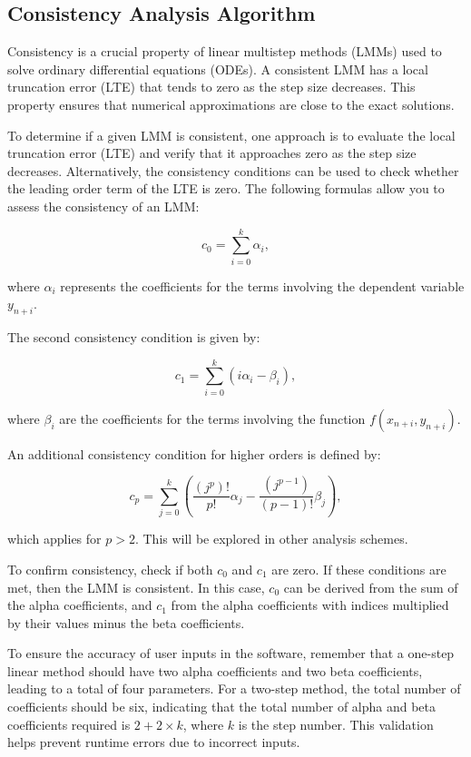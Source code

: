 \subsection{Consistency Analysis Algorithm}

Consistency is a crucial property of linear multistep methods (LMMs) used to solve ordinary differential equations (ODEs). A consistent LMM has a local truncation error (LTE) that tends to zero as the step size decreases. This property ensures that numerical approximations are close to the exact solutions.

To determine if a given LMM is consistent, one approach is to evaluate the local truncation error (LTE) and verify that it approaches zero as the step size decreases. Alternatively, the consistency conditions can be used to check whether the leading order term of the LTE is zero. The following formulas allow you to assess the consistency of an LMM:

\begin{equation}
   c_0 = \sum_{i=0}^{k} \alpha_{i},
\end{equation}

where \(\alpha_{i}\) represents the coefficients for the terms involving the dependent variable \(y_{n+i}\).

The second consistency condition is given by:

\begin{equation}
   c_1 = \sum_{i=0}^{k} (i \alpha_{i} - \beta_{i}),
\end{equation}

where \(\beta_{i}\) are the coefficients for the terms involving the function \(f(x_{n+i}, y_{n+i})\).

An additional consistency condition for higher orders is defined by:

\begin{equation}
   c_p = \sum_{j=0}^{k} \left( \frac{(j^p)!}{p!} \alpha_j - \frac{(j^{p-1})}{(p-1)!} \beta_j \right),
\end{equation}

which applies for \(p > 2\). This will be explored in other analysis schemes.

To confirm consistency, check if both \(c_0\) and \(c_1\) are zero. If these conditions are met, then the LMM is consistent. In this case, \(c_0\) can be derived from the sum of the alpha coefficients, and \(c_1\) from the alpha coefficients with indices multiplied by their values minus the beta coefficients.

To ensure the accuracy of user inputs in the software, remember that a one-step linear method should have two alpha coefficients and two beta coefficients, leading to a total of four parameters. For a two-step method, the total number of coefficients should be six, indicating that the total number of alpha and beta coefficients required is \(2 + 2 \times k\), where \(k\) is the step number. This validation helps prevent runtime errors due to incorrect inputs.

